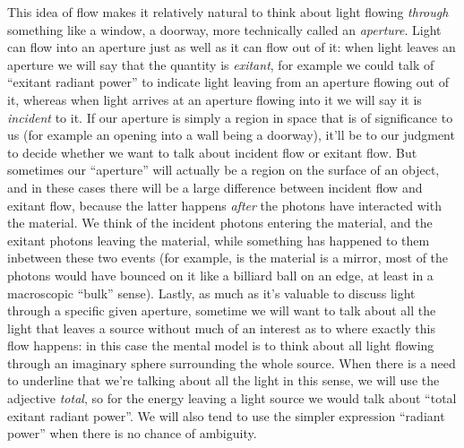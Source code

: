 This idea of flow makes it relatively natural to think about light flowing \emph{through}
something like a window, a doorway, more technically called an \textsl{\gls{aperture}}. 
Light can flow into an aperture just as well as it can flow out of it:
when light leaves an aperture we will say that the quantity is \textsl{\gls{exitant}},
for example we could talk of ``exitant radiant power'' to indicate light leaving from an
aperture flowing out of it, whereas when light arrives at an aperture flowing into it 
we will say it is \textsl{\gls{incident}} to it. 
If our aperture is simply a region in space that is of significance to us (for example
an opening into a wall being a doorway), it'll be to our judgment to decide whether we want
to talk about incident flow or exitant flow. 
But sometimes our ``aperture'' will actually be a region on the surface of an object, and in these cases
there will be a large difference between incident flow and exitant flow, because the latter happens
\emph{after} the photons have interacted with the material. We think of the incident photons
entering the material, and the exitant photons leaving the material, while something has happened
to them inbetween these two events (for example, is the material is a mirror, most of the photons
would have bounced on it like a billiard ball on an edge, at least in a macroscopic ``bulk'' sense).
Lastly, as much as it's valuable to discuss light through a specific given aperture,
sometime we will want to talk about all the light that leaves a source without much of an
interest as to where exactly this flow happens: in this case the mental model
is to think about all light flowing through an imaginary sphere surrounding the whole source.
When there is a need to underline that we're talking about all the light in this sense, we will use the
adjective \textsl{total}, so for the energy leaving a light source we would talk about ``total exitant 
radiant power''. We will also tend to use the simpler expression ``radiant power'' when there is no
chance of ambiguity.

